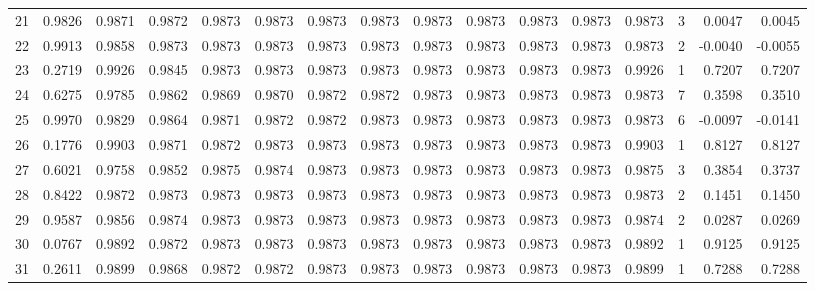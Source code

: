 \begin{tabular}{lrrrrrrrrrrrrrrr}
21  &      0.9826 &  0.9871 &  0.9872 &  0.9873 &  0.9873 &  0.9873 &  0.9873 &  0.9873 &  0.9873 &  0.9873 &   0.9873 &     0.9873 &      3 &                    0.0047 &                     0.0045 \\
22  &      0.9913 &  0.9858 &  0.9873 &  0.9873 &  0.9873 &  0.9873 &  0.9873 &  0.9873 &  0.9873 &  0.9873 &   0.9873 &     0.9873 &      2 &                   -0.0040 &                    -0.0055 \\
23  &      0.2719 &  0.9926 &  0.9845 &  0.9873 &  0.9873 &  0.9873 &  0.9873 &  0.9873 &  0.9873 &  0.9873 &   0.9873 &     0.9926 &      1 &                    0.7207 &                     0.7207 \\
24  &      0.6275 &  0.9785 &  0.9862 &  0.9869 &  0.9870 &  0.9872 &  0.9872 &  0.9873 &  0.9873 &  0.9873 &   0.9873 &     0.9873 &      7 &                    0.3598 &                     0.3510 \\
25  &      0.9970 &  0.9829 &  0.9864 &  0.9871 &  0.9872 &  0.9872 &  0.9873 &  0.9873 &  0.9873 &  0.9873 &   0.9873 &     0.9873 &      6 &                   -0.0097 &                    -0.0141 \\
26  &      0.1776 &  0.9903 &  0.9871 &  0.9872 &  0.9873 &  0.9873 &  0.9873 &  0.9873 &  0.9873 &  0.9873 &   0.9873 &     0.9903 &      1 &                    0.8127 &                     0.8127 \\
27  &      0.6021 &  0.9758 &  0.9852 &  0.9875 &  0.9874 &  0.9873 &  0.9873 &  0.9873 &  0.9873 &  0.9873 &   0.9873 &     0.9875 &      3 &                    0.3854 &                     0.3737 \\
28  &      0.8422 &  0.9872 &  0.9873 &  0.9873 &  0.9873 &  0.9873 &  0.9873 &  0.9873 &  0.9873 &  0.9873 &   0.9873 &     0.9873 &      2 &                    0.1451 &                     0.1450 \\
29  &      0.9587 &  0.9856 &  0.9874 &  0.9873 &  0.9873 &  0.9873 &  0.9873 &  0.9873 &  0.9873 &  0.9873 &   0.9873 &     0.9874 &      2 &                    0.0287 &                     0.0269 \\
30  &      0.0767 &  0.9892 &  0.9872 &  0.9873 &  0.9873 &  0.9873 &  0.9873 &  0.9873 &  0.9873 &  0.9873 &   0.9873 &     0.9892 &      1 &                    0.9125 &                     0.9125 \\
31  &      0.2611 &  0.9899 &  0.9868 &  0.9872 &  0.9872 &  0.9873 &  0.9873 &  0.9873 &  0.9873 &  0.9873 &   0.9873 &     0.9899 &      1 &                    0.7288 &                     0.7288 \\

\end{tabular}
